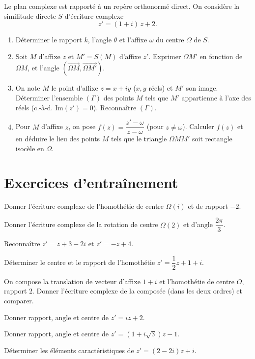 \exo{} Le plan complexe est rapporté à un repère orthonormé direct. On considère la similitude directe $S$
d'écriture complexe
\[
z'=(1+i)\,z+2.
\]
\begin{enumerate}[label=\arabic*)]
\item Déterminer le rapport $k$, l'angle $\theta$ et l'affixe $\omega$ du centre $\Omega$ de $S$.
\item Soit $M$ d'affixe $z$ et $M'=S(M)$ d'affixe $z'$. Exprimer $\Omega M'$ en fonction de $\Omega M$,
et l'angle $(\overrightarrow{\Omega M},\overrightarrow{\Omega M'})$.
\item On note $M$ le point d'affixe $z=x+iy$ ($x,y$ réels) et $M'$ son image. Déterminer l'ensemble $(\Gamma)$
des points $M$ tels que $M'$ appartienne à l'axe des réels (c.-à-d. $\mathrm{Im}(z')=0$). Reconnaître $(\Gamma)$.
\item Pour $M$ d'affixe $z$, on pose $f(z)=\dfrac{z'-\omega}{z-\omega}$ (pour $z\neq\omega$). Calculer $f(z)$ et
en déduire le lieu des points $M$ tels que le triangle $\Omega M M'$ soit rectangle isocèle en $\Omega$.
\end{enumerate}

\section{Exercices d'entraînement}

\exo{} Donner l'écriture complexe de l'homothétie de centre $\Omega(i)$ et de rapport $-2$.

\exo{} Donner l'écriture complexe de la rotation de centre $\Omega(2)$ et d'angle $\dfrac{2\pi}{3}$.

\exo{} Reconnaître $z'=z+3-2i$ et $z'=-z+4$.

\exo{} Déterminer le centre et le rapport de l'homothétie $z'=\dfrac12 z+1+i$.

\exo{} On compose la translation de vecteur d'affixe $1+i$ et l'homothétie de centre $O$, rapport $2$.
Donner l'écriture complexe de la composée (dans les deux ordres) et comparer.

\exo{} Donner rapport, angle et centre de $z'=iz+2$.

\exo{} Donner rapport, angle et centre de $z'=(1+i\sqrt3)z-1$.

\exo{} Déterminer les éléments caractéristiques de $z'=(2-2i)z+i$.

